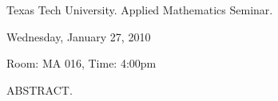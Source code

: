 \documentclass[oneside]{amsart}
\newcommand{\talktitle}{}
\newcommand{\talkspeaker}{}
\newcommand{\talkdate}{Wednesday, January 27, 2010}
\newcommand{\talkabstract}{

}
\begin{document}
\thispagestyle{empty}

\begin{center}
Texas Tech University.  Applied Mathematics Seminar.

\end{center}

\begin{center}

\textbf{\LARGE {\uppercase{\talktitle}} }

\talkspeaker

\talkdate

Room: MA 016, Time: 4:00pm

\end{center}

ABSTRACT.
\talkabstract
\end{document}
